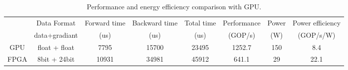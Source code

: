 \begin{table*}[tb]
    \centering
    \caption{Performance and energy efficiency comparison with GPU. }
      \begin{tabular}{c|c|c|c|c|c|c|c}
      \hline
            & Data Format & Forward time & Backward time & Total time & Performance & Power & Power efficiency \\
            & data+gradiant & (us)  & (us)  & (us)  & (GOP/s) & (W)   & (GOP/s/W) \\
      \hline
      GPU   & float + float & 7795  & 15700  & 23495  & 1252.7  & 150   & 8.4  \\
      FPGA  & 8bit + 24bit & 10931  & 34981  & 45912  & 641.1  & 29    & 22.1  \\
      \hline
      \end{tabular}%
    \label{tab:exp_comp}%
  \end{table*}%